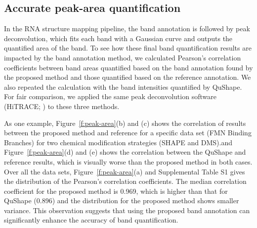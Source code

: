 \subsection{Accurate peak-area quantification}\label{ss:peak-area}
In the RNA structure mapping pipeline, the band annotation is followed by peak deconvolution, which fits each band with a Gaussian curve and outputs the quantified area of the band. To see how these final band quantification results are impacted by the band annotation method, we calculated Pearson's correlation coefficients between band areas quantified based on the band annotation found by the proposed method and those quantified based on the reference annotation. We also repeated the calculation with the band intensities quantified by QuShape. For fair comparison, we applied the same peak deconvolution software (HiTRACE; \citealp{Yoon2011}) to these three methods.

As one example, Figure~\ref{f:peak-area}(b) and (c) shows the correlation of results between the proposed method and reference for a specific data set (FMN Binding Branches) for two chemical modification strategies (SHAPE and DMS).and Figure~\ref{f:peak-area}(d) and (e) shows the correlation between the QuShape and reference results, which is visually worse than the proposed method in both cases. Over all the data sets, Figure~\ref{f:peak-area}(a) and Supplemental Table S1 gives the distribution of the Pearson's correlation coefficients. The median correlation coefficient for the proposed method is 0.969, which is higher than that for QuShape (0.896) and the distribution for the proposed method shows smaller variance. This observation suggests that using the proposed band annotation can significantly enhance the accuracy of band quantification. 


